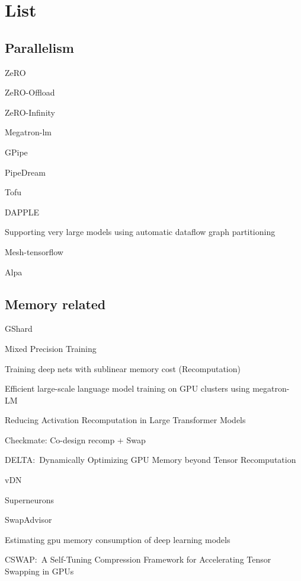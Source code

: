 \section{List}
\subsection{Parallelism}


ZeRO~\cite{zero}

ZeRO-Offload~\cite{zero-offload}

ZeRO-Infinity~\cite{zero-infinity}\

Megatron-lm~\cite{megatron-lm}

GPipe~\cite{gpipe,kim2020torchgpipe}

PipeDream~\cite{Narayanan2019PipeDream}

Tofu~\cite{Wang2018Tofu}

DAPPLE~\cite{fan2021dapple}

Supporting very large models using automatic dataflow graph partitioning~\cite{wang2019supporting}

Mesh-tensorflow~\cite{shazeer2018mesh}

Alpa~\cite{Zheng2022Alpa}


\subsection{Memory related}
GShard~\cite{lepikhin2020gshard}

Mixed Precision Training~\cite{micikevicius2017mixed}

Training deep nets with sublinear memory cost (Recomputation)~\cite{chen2016training}

Efficient large-scale language model training on GPU clusters using megatron-LM~\cite{narayanan2021efficient}

Reducing Activation Recomputation in Large Transformer Models~\cite{megatron3}

Checkmate: Co-design recomp + Swap~\cite{checkmate}

DELTA:\ Dynamically Optimizing GPU Memory beyond Tensor Recomputation~\cite{tang2022delta}

vDN~\cite{rhu2016vdnn}

Superneurons~\cite{wang2018superneurons}

SwapAdvisor~\cite{huang2020swapadvisor}

Estimating gpu memory consumption of deep learning models~\cite{gao2020estimating}

CSWAP:\ A Self-Tuning Compression Framework for Accelerating Tensor Swapping in GPUs~\cite{chen2021cswap}

